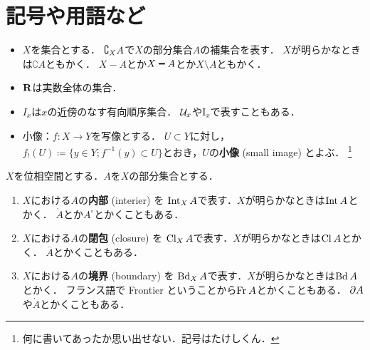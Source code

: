 \section*{記号や用語など}
\begin{itemize}
    \item \(X\)を集合とする．
    \(\dip \complement_X A\)で\(X\)の部分集合\(A\)の補集合を表す．
    \(X\)が明らかなときは\(\complement{A}\)ともかく．
    \(X-A\)とか\(X\smi A\)とか\(X\setminus A\)ともかく．
    \item \(\rr\)は実数全体の集合．
    \item \(I_x\)は\(x\)の近傍のなす有向順序集合．
    \({\cU}_x\)や\(\mathrm{I}_x\)で表すこともある．
    \item 小像：\(f\colon X\to Y\)を写像とする．
    \(U\subset Y\)に対し，\(
        f_!(U)\coloneqq\{y\in Y; f^{-1}(y)\subset U\}
    \)とおき，\(U\)の\textbf{小像} (small image) とよぶ．
    \footnote{何に書いてあったか思い出せない．記号はたけしくん\cite{Sai09}．}
\end{itemize}

\(X\)を位相空間とする．\(A\)を\(X\)の部分集合とする．
\begin{enumerate}
    \item \(X\)における\(A\)の\textbf{内部} (interier) を
    \(\Int[X]A\)で表す．\(X\)が明らかなときは\(\Int{A}\)とかく．
    \(\mathring{A}\)とか\(A^{\circ}\)とかくこともある．
    \item \(X\)における\(A\)の\textbf{閉包} (closure) を
    \(\Cl[X]A\)で表す．\(X\)が明らかなときは\(\Cl{A}\)とかく．
    \(\overline{A}\)とかくこともある．
    \item \(X\)における\(A\)の\textbf{境界} (boundary) を
    \(\Bd[X]A\)で表す．\(X\)が明らかなときは\(\Bd{A}\)とかく．
    フランス語で Frontier ということから\(\Fr A\)とかくこともある．
    \(\p{A}\)や\(\dot{A}\)とかくこともある．
\end{enumerate}


